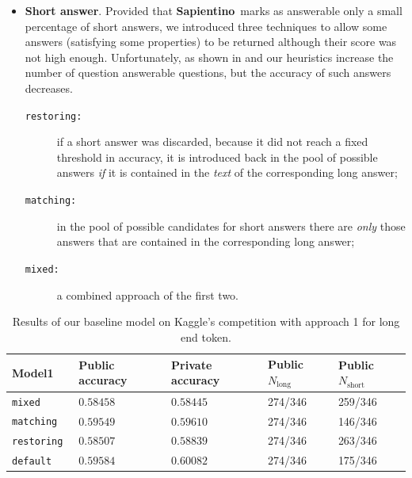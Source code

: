 \documentclass[10pt,hidelinks]{article}
\newcommand\nomefico{\textbf{Sapientino}}
\def\colOne{white}
\def\colTwo{pblue!10}
\def\colHea{pblue!35}
\begin{document}
\begin{itemize}
    \item \textbf{Short answer}. Provided that \nomefico~marks as answerable only a small percentage of short answers, we introduced three techniques to allow some answers (satisfying some properties) to be returned although their score was not high enough.
    Unfortunately, as shown in  and  our heuristics increase the number of question answerable questions, but the accuracy of such answers decreases.
    \begin{description}
    \item[\tt restoring:] if a short answer was discarded, because it did not reach a fixed threshold in accuracy, it is introduced back in the pool of possible answers \emph{if} it is contained in the \emph{text} of the corresponding long answer; 
    \item[\tt matching:] in the pool of possible candidates for short answers there are \emph{only} those answers that are contained in the corresponding long answer;
    \item[\tt mixed:] a combined approach of the first two.
\end{description}
\end{itemize}

\begin{table}[ht!] 
	\footnotesize\centering
	\rowcolors{2}{\colOne}{\colTwo}
	\begin{tabular}{|p{17mm}|p{21mm}|p{21mm}|p{17mm}|p{17mm}|}
		\hline\rowcolor{\colHea} Model1 & Public accuracy & Private accuracy & Public $N_{\text{long}}$ & Public $N_{\text{short}}$ \\\hline\hline
		\tt mixed & $0.58458$ & $0.58445$ & 274/346 & 259/346 \\
		\tt matching & $0.59549$ & $0.59610$ & 274/346 & 146/346 \\
		\tt restoring & $0.58507$ & $0.58839$ & 274/346 & 263/346 \\
		\tt default & $0.59584$ & $0.60082$ & 274/346 & 175/346\\
		\hline
		\end{tabular}
	\caption{Results of our baseline model on Kaggle's competition with approach 1 for long end token.}\label{model1Result}
\end{table}
\end{document}
